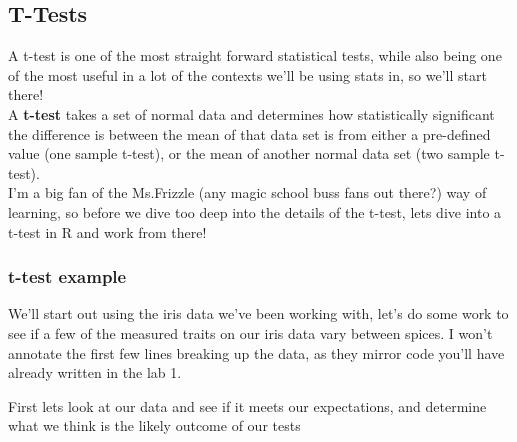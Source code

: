 \documentclass[
]{article}
\newenvironment{Shaded}{\begin{snugshade}}{\end{snugshade}}
\newcommand{\CommentTok}[1]{\textcolor[rgb]{0.56,0.35,0.01}{\textit{#1}}}
\newcommand{\DataTypeTok}[1]{\textcolor[rgb]{0.13,0.29,0.53}{#1}}
\newcommand{\KeywordTok}[1]{\textcolor[rgb]{0.13,0.29,0.53}{\textbf{#1}}}
\newcommand{\NormalTok}[1]{#1}
\newcommand{\OperatorTok}[1]{\textcolor[rgb]{0.81,0.36,0.00}{\textbf{#1}}}
\newcommand{\StringTok}[1]{\textcolor[rgb]{0.31,0.60,0.02}{#1}}
\begin{document}
\hypertarget{t-tests}{%
\subsection{T-Tests}\label{t-tests}}

A t-test is one of the most straight forward statistical tests, while
also being one of the most useful in a lot of the contexts we'll be
using stats in, so we'll start there!\\
A \textbf{t-test} takes a set of normal data and determines how
statistically significant the difference is between the mean of that
data set is from either a pre-defined value (one sample t-test), or the
mean of another normal data set (two sample t-test).\\
I'm a big fan of the Ms.Frizzle (any magic school buss fans out there?)
way of learning, so before we dive too deep into the details of the
t-test, lets dive into a t-test in R and work from there!

\hypertarget{t-test-example}{%
\subsubsection{t-test example}\label{t-test-example}}

We'll start out using the iris data we've been working with, let's do
some work to see if a few of the measured traits on our iris data vary
between spices. I won't annotate the first few lines breaking up the
data, as they mirror code you'll have already written in the lab 1.

First lets look at our data and see if it meets our expectations, and
determine what we think is the likely outcome of our tests

\begin{Shaded}
\end{Shaded}
\end{document}
